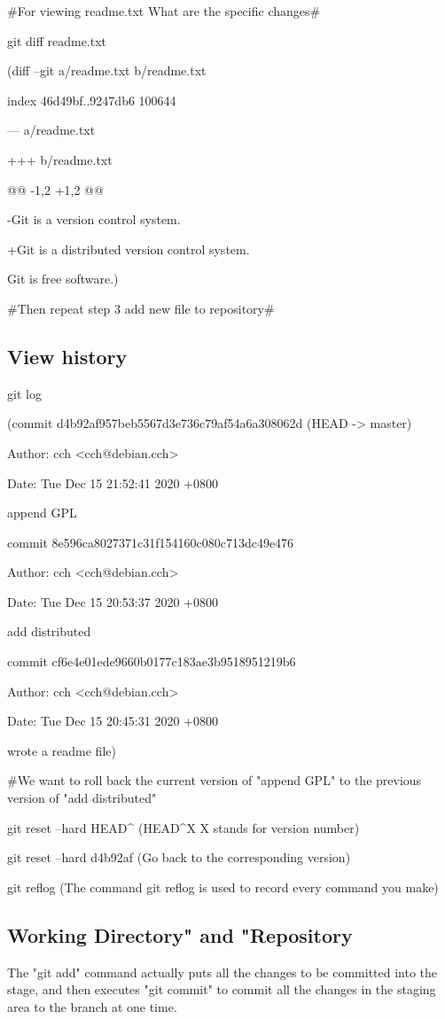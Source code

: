     #For viewing readme.txt What are the specific changes#
    
    git diff readme.txt 
    
    (diff --git a/readme.txt b/readme.txt
    
    index 46d49bf..9247db6 100644
    
    --- a/readme.txt
    
    +++ b/readme.txt
    
    @@ -1,2 +1,2 @@
    
    -Git is a version control system.
    
    +Git is a distributed version control system.
    
    Git is free software.)
    
    #Then repeat step 3 add new file to repository#
\subsection{View history}
    git log
    
    (commit d4b92af957beb5567d3e736c79af54a6a308062d (HEAD -> master)
    
    Author: cch <cch@debian.cch>
    
    Date:   Tue Dec 15 21:52:41 2020 +0800
    

    append GPL
    

    commit 8e596ca8027371c31f154160c080c713dc49e476
    
    Author: cch <cch@debian.cch>
    
    Date:   Tue Dec 15 20:53:37 2020 +0800
    
    add distributed

    commit cf6e4e01ede9660b0177c183ae3b9518951219b6
    
    Author: cch <cch@debian.cch>
    
    Date:   Tue Dec 15 20:45:31 2020 +0800

    wrote a readme file)
    
    #We want to roll back the current version of "append GPL" to the previous version of "add distributed"
    
    git reset --hard HEAD^ (HEAD^X X stands for version number)
    
    git reset --hard d4b92af (Go back to the corresponding version)
    
    git reflog (The command git reflog is used to record every command you make)
\subsection{Working Directory" and "Repository}
The "git add" command actually puts all the changes to be committed into the stage, and then executes "git commit" to commit all the changes in the staging area to the branch at one time.

